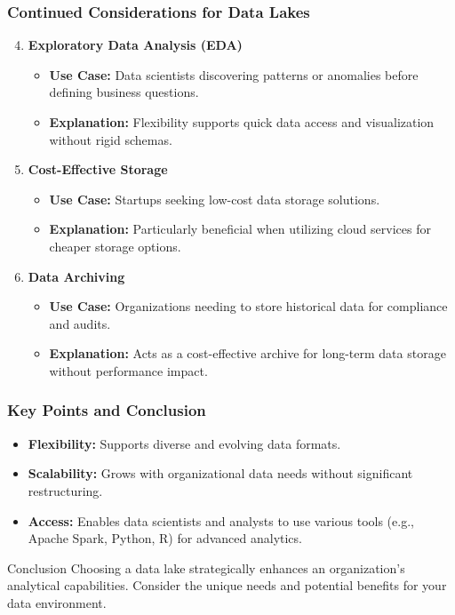 \documentclass[aspectratio=169]{beamer}
\begin{document}
\begin{frame}[fragile]
    \frametitle{Continued Considerations for Data Lakes}
    \begin{enumerate}
        \setcounter{enumi}{3}
        \item \textbf{Exploratory Data Analysis (EDA)}
            \begin{itemize}
                \item \textbf{Use Case:} Data scientists discovering patterns or anomalies before defining business questions.
                \item \textbf{Explanation:} Flexibility supports quick data access and visualization without rigid schemas.
            \end{itemize}
        \item \textbf{Cost-Effective Storage}
            \begin{itemize}
                \item \textbf{Use Case:} Startups seeking low-cost data storage solutions.
                \item \textbf{Explanation:} Particularly beneficial when utilizing cloud services for cheaper storage options.
            \end{itemize}
        \item \textbf{Data Archiving}
            \begin{itemize}
                \item \textbf{Use Case:} Organizations needing to store historical data for compliance and audits.
                \item \textbf{Explanation:} Acts as a cost-effective archive for long-term data storage without performance impact.
            \end{itemize}
    \end{enumerate}
\end{frame}

\begin{frame}[fragile]
    \frametitle{Key Points and Conclusion}
    \begin{itemize}
        \item \textbf{Flexibility:} Supports diverse and evolving data formats.
        \item \textbf{Scalability:} Grows with organizational data needs without significant restructuring.
        \item \textbf{Access:} Enables data scientists and analysts to use various tools (e.g., Apache Spark, Python, R) for advanced analytics.
    \end{itemize}
    \begin{block}{Conclusion}
        Choosing a data lake strategically enhances an organization's analytical capabilities. Consider the unique needs and potential benefits for your data environment.
    \end{block}
\end{frame}
\end{document}
